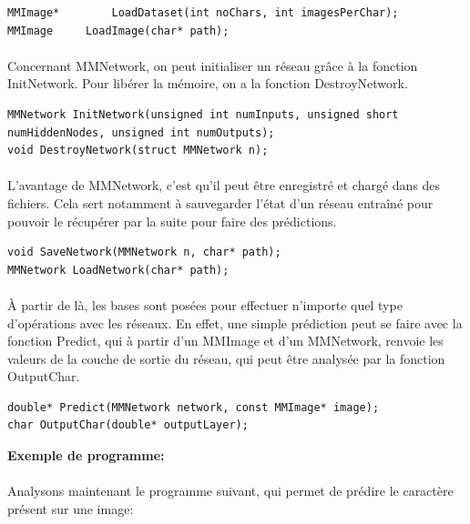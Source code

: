 \documentclass{article}
\begin{document}
\begin{lstlisting}
MMImage*		LoadDataset(int noChars, int imagesPerChar);
MMImage		LoadImage(char* path);
\end{lstlisting}

\paragraph{}Concernant MMNetwork, on peut initialiser un réseau grâce à la fonction InitNetwork.
Pour libérer la mémoire, on a la fonction DestroyNetwork.

\begin{lstlisting}
MMNetwork InitNetwork(unsigned int numInputs, unsigned short numHiddenNodes, unsigned int numOutputs);
void DestroyNetwork(struct MMNetwork n);

\end{lstlisting}

\paragraph{}L'avantage de MMNetwork, c'est qu'il peut être enregistré et chargé dans des fichiers. Cela sert notamment à sauvegarder l'état d'un réseau entraîné pour pouvoir le récupérer par la suite pour faire des prédictions.

\begin{lstlisting}
void SaveNetwork(MMNetwork n, char* path);
MMNetwork LoadNetwork(char* path);
\end{lstlisting}


\paragraph{}
À partir de là, les bases sont posées pour effectuer n'importe quel type d'opérations avec les réseaux. En effet, une simple prédiction peut se faire avec la fonction Predict, qui à partir d'un MMImage et d'un MMNetwork, renvoie les valeurs de la couche de sortie du réseau, qui peut être analysée par la fonction OutputChar.

\begin{lstlisting}
double*	Predict(MMNetwork network, const MMImage* image);
char OutputChar(double* outputLayer);
\end{lstlisting}

\textbf{Exemple de programme:}

\paragraph{}Analysons maintenant le programme suivant, qui permet de prédire le caractère présent sur une image:
\end{document}
